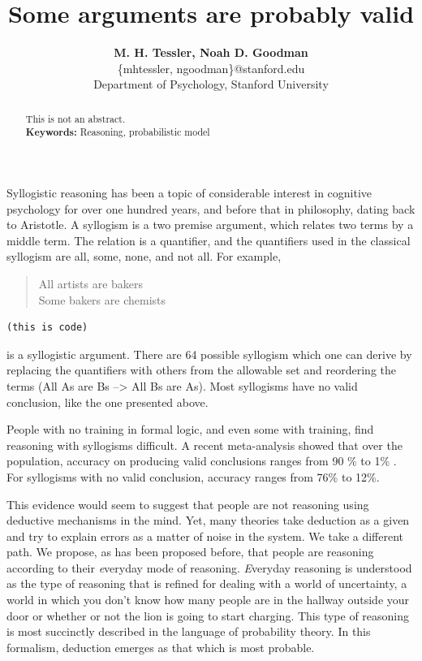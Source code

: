\documentclass[10pt,letterpaper]{article}
\begin{document}
\title{Some arguments are probably valid}
 
\author{{\large \bf M. H. Tessler, Noah D. Goodman } \\
	\{mhtessler, ngoodman\}@stanford.edu \\
  Department of Psychology, Stanford University}

\maketitle


\begin{abstract}
This is not an abstract.\\
\textbf{Keywords:} 
Reasoning, probabilistic model
\end{abstract}

Syllogistic reasoning has been a topic of considerable interest in cognitive psychology for over one hundred years, and before that in philosophy, dating back to Aristotle. A syllogism is a two premise argument, which relates two terms by a middle term. The relation is a quantifier, and the quantifiers used in the classical syllogism are all, some, none, and not all. For example,

\begin{quotation}
All artists are bakers\\
Some bakers are chemists\\
\end{quotation}

\begin{lstlisting}
(this is code)
\end{lstlisting}


is a syllogistic argument. There are 64 possible syllogism which one can derive by replacing the quantifiers with others from the allowable set and reordering the terms (All As are Bs --> All Bs are As). Most syllogisms have no valid conclusion, like the one presented above. 

People with no training in formal logic, and even some with training, find reasoning with syllogisms difficult. A recent meta-analysis showed that over the population, accuracy on producing valid conclusions ranges from 90 \% to 1\% \cite{khemlaniJL2012}. For syllogisms with no valid conclusion, accuracy ranges from 76\% to 12\%.

This evidence would seem to suggest that people are not reasoning using deductive mechanisms in the mind. Yet, many theories take deduction as a given and try to explain errors as a matter of noise in the system. We take a different path. We propose, as has been proposed before, that people are reasoning according to their {\emph everyday} mode of reasoning. {\emph Everyday} reasoning is understood as the type of reasoning that is refined for dealing with a world of uncertainty, a world in which you don't know how many people are in the hallway outside your door or whether or not the lion is going to start charging. This type of reasoning is most succinctly described in the language of probability theory. In this formalism, deduction emerges as that which is most probable.
\end{document}
